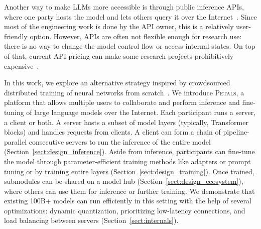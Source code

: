 Another way to make LLMs more accessible is through public inference APIs, where one party hosts the model and lets others query it over the Internet~\citep{openai-api,jurrasic,forefront}. Since most of the engineering work is done by the API owner, this is a relatively user-friendly option.
However, APIs are often not flexible enough for research use: there is no way to change the model control flow or access internal states. On top of that, current API pricing can make some research projects prohibitively expensive~\citep{tfew}.

In this work, we explore an alternative strategy inspired by crowdsourced distributed training of neural networks from scratch~\citep{hivemind_dmoe}. We introduce \textsc{Petals}, a platform that allows multiple users to collaborate and perform inference and fine-tuning of large language models over the Internet.
Each participant runs a server, a client or both. A server hosts a subset of model layers (typically, Transformer blocks) and handles requests from clients.
A client can form a chain of pipeline-parallel consecutive servers to run the inference of the entire model (Section~\ref{sect:design_inference}).
Aside from inference, participants can fine-tune the model through parameter-efficient training methods like adapters \citep{houlsby2019parameter} or prompt tuning \citep{ptune-lester} or by training entire layers (Section~\ref{sect:design_training}). Once trained, submodules can be shared on a model hub (Section~\ref{sect:design_ecosystem}), where others can use them for inference or further training.
We demonstrate that existing 100B+ models can run efficiently in this setting with the help of several optimizations: dynamic quantization, prioritizing low-latency connections, and load balancing between servers (Section~\ref{sect:internals}).


